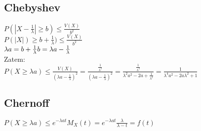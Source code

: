 \documentclass{article}
\begin{document}
\subsection{Chebyshev}
$P(|X - \frac 1 \lambda| \geqslant b) \leqslant \frac {V(X)} {b^2}$ \\
$P(|X|) \geqslant b + \frac 1 \lambda) \leqslant \frac {V(X)} {b^2}$ \\
$\lambda a = b + \frac 1 \lambda \\
b = \lambda a - \frac 1 \lambda $\\
Zatem: \\
$P(X \geqslant\lambda a) \leqslant \frac {V(X)}  {(\lambda a - {\frac 1 \lambda})^2} = \frac {\frac 1 {\lambda^2}} {(\lambda a - {\frac 1 \lambda})^2} = \frac {\frac 1 {\lambda^2}} {\lambda^2 a^2 - 2 a + \frac 1 {\lambda^2}} = \frac 1 {\lambda^4 a^2 - 2 a {\lambda^2} + 1} $
\subsection{Chernoff}
$P(X \geqslant\lambda a) \leqslant e^{-\lambda a t} M_X(t) = e^{-\lambda a t} \frac \lambda {\lambda - t} = f(t)$
\end{document}
